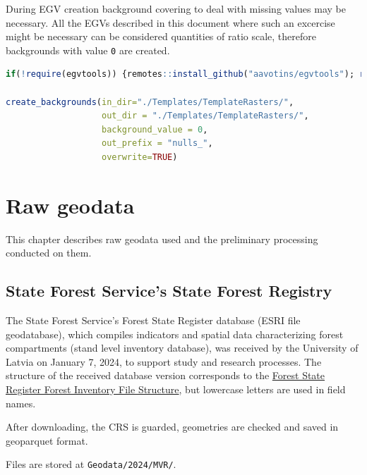 \documentclass[
]{book}
\newcommand{\passthrough}[1]{#1}
\begin{document}
During EGV creation background covering to deal with missing values may be
necessary. All the EGVs described in this document where such an excercise might
be necessary can be considered quantities of ratio scale, therefore backgrounds
with value \passthrough{\lstinline!0!} are created.

\begin{lstlisting}[language=R]
if(!require(egvtools)) {remotes::install_github("aavotins/egvtools"); require(egvtools)}

create_backgrounds(in_dir="./Templates/TemplateRasters/",
                   out_dir = "./Templates/TemplateRasters/",
                   background_value = 0,
                   out_prefix = "nulls_",
                   overwrite=TRUE)
\end{lstlisting}

\chapter{Raw geodata}\label{Ch04}

This chapter describes raw geodata used and the preliminary processing conducted on them.

\section{State Forest Service's State Forest Registry}\label{Ch04.01}

The State Forest Service's Forest State Register database (ESRI file geodatabase),
which compiles indicators and spatial data characterizing forest compartments
(stand level inventory database), was received by the University of
Latvia on January 7, 2024, to support study and research processes. The structure
of the received database version corresponds to
the \href{https://www.vmd.gov.lv/lv/meza-valsts-registra-meza-inventarizacijas-failu-struktura}{Forest State Register Forest Inventory File Structure}, but
lowercase letters are used in field names.

After downloading, the CRS is guarded, geometries are checked and saved in
geoparquet format.

Files are stored at \passthrough{\lstinline!Geodata/2024/MVR/!}.
\end{document}
